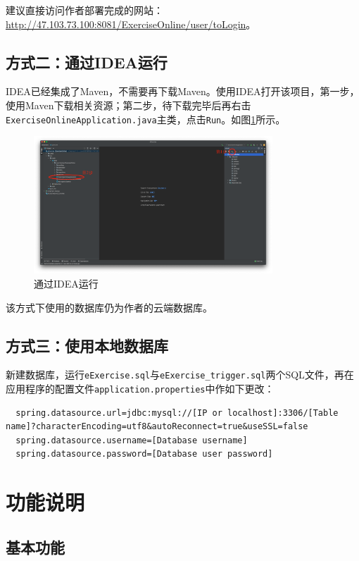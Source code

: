\documentclass{nwafucoursepaper}
\begin{document}
建议直接访问作者部署完成的网站：\url{http://47.103.73.100:8081/ExerciseOnline/user/toLogin}。

\subsection{方式二：通过IDEA运行}

IDEA已经集成了Maven，不需要再下载Maven。使用IDEA打开该项目，第一步，使用Maven下载相关资源；第二步，待下载完毕后再右击\verb|ExerciseOnlineApplication.java|主类，点击\verb|Run|。如图\ref{idea_instruct}所示。
\begin{figure}[h]
  \centering
  \includegraphics[width=0.8\textwidth]{idea_instruct.png}
  \caption{通过IDEA运行}
  \label{idea_instruct}
\end{figure}

该方式下使用的数据库仍为作者的云端数据库。

\subsection{方式三：使用本地数据库}

新建数据库，运行\verb|eExercise.sql|与\verb|eExercise_trigger.sql|两个SQL文件，再在应用程序的配置文件\verb|application.properties|中作如下更改：
\begin{lstlisting}
  spring.datasource.url=jdbc:mysql://[IP or localhost]:3306/[Table name]?characterEncoding=utf8&autoReconnect=true&useSSL=false
  spring.datasource.username=[Database username]
  spring.datasource.password=[Database user password]
\end{lstlisting}

\newpage

\section{功能说明}

\subsection{基本功能}
\end{document}
